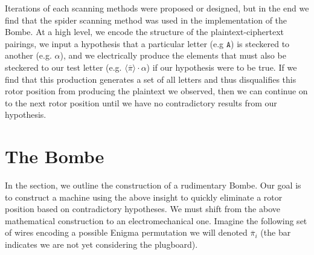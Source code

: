 Iterations of each scanning methods were proposed or designed, but in
the end we find that the spider scanning method was used in the
implementation of the Bombe. At a high level, we encode the structure
of the plaintext-ciphertext pairings, we input a hypothesis that a particular
letter (e.g $\texttt{A}$) is steckered to another (e.g. $\alpha$), and we
electrically produce the elements that must also be steckered to our test letter
(e.g. $\langle\overline{\pi}\rangle\cdot\alpha$) if our hypothesis
were to be true. If we find that this production generates a set of
all letters and thus disqualifies this rotor position from producing
the plaintext we observed, then we can continue on to the next rotor
position until we have no contradictory results from our hypothesis.

\section{The Bombe}

In the section, we outline the construction of a rudimentary Bombe.
Our goal is to construct a machine using the above insight to quickly
eliminate a rotor position based on contradictory hypotheses. We must
shift from the above mathematical construction to an
electromechanical one. %
Imagine the following set of wires encoding a possible Enigma
permutation we will denoted $\overline\pi_i$ (the bar
indicates we are not yet considering the plugboard).


